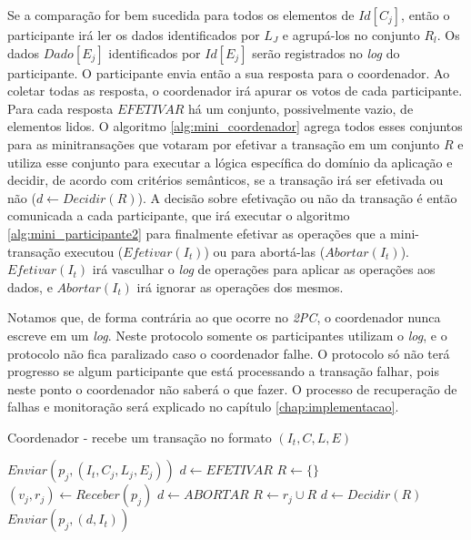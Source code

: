 \documentclass[11pt,twoside,a4paper]{book}
\begin{document}
Se a comparação for bem sucedida para todos os elementos de $Id[C_j]$, então o participante irá ler os dados identificados por $L_J$ e agrupá-los no conjunto $R_l$. Os dados $Dado[E_j]$ identificados por $Id[E_j]$ serão registrados no \emph{log} do participante. O participante envia então a sua resposta para o coordenador. Ao coletar todas as resposta, o coordenador irá apurar os votos de cada participante. Para cada resposta $EFETIVAR$ há um conjunto, possivelmente vazio, de elementos lidos. O algoritmo \ref{alg:mini_coordenador} agrega todos esses conjuntos para as minitransações que votaram por efetivar a transação em um conjunto $R$ e utiliza esse conjunto para executar a lógica específica do domínio da aplicação e decidir, de acordo com critérios semânticos, se a transação irá ser efetivada ou não ($d \gets Decidir(R)$). A decisão sobre efetivação ou não da transação é então comunicada a cada participante, que irá executar o algoritmo \ref{alg:mini_participante2} para finalmente efetivar as operações que a mini-transação executou ($Efetivar(I_t)$) ou para abortá-las ($Abortar(I_t)$). $Efetivar(I_t)$ irá vasculhar o \emph{log} de operações para aplicar as operações aos dados, e $Abortar(I_t)$ irá ignorar as operações dos mesmos.

Notamos que, de forma contrária ao que ocorre no \emph{2PC}, o coordenador nunca escreve em um \emph{log}. Neste protocolo somente os participantes utilizam o \emph{log}, e o protocolo não fica paralizado caso o coordenador falhe. O protocolo só não terá progresso se algum participante que está processando a transação falhar, pois neste ponto o coordenador não saberá o que fazer. O processo de recuperação de falhas e monitoração será explicado no capítulo \ref{chap:implementacao}.

\begin{algorithm}
\caption{Coordenador - recebe um transação no formato $(I_t, C, L, E)$}
\label{alg:mini_coordenador}
\begin{algorithmic}[1]
	\State $Enviar(p_j, (I_t, C_j, L_j, E_j))$
\EndFor
\State $d \gets EFETIVAR$
\State $R \gets \{\}$
	\State $(v_j, r_j) \gets Receber(p_j)$
		\State $d \gets ABORTAR$
	\Else
		\State $R \gets r_j \cup R$
	\EndIf
\EndFor
{}
	\State $d \gets Decidir(R)$
\EndIf
{}
	\State $Enviar(p_j, (d, I_t))$
\EndFor
\end{algorithmic}
\end{algorithm}
\end{document}
